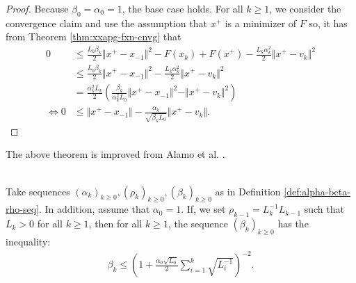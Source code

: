 \documentclass[12pt]{report}
\begin{document}
\begin{proof}
            Because $\beta_0 = \alpha_0 = 1$, the base case holds. 
            For all $k \ge 1$, we consider the convergence claim and use the assumption that $x^+$ is a minimizer of $F$ so, it has from Theorem \ref{thm:xxapg-fxn-cnvg} that 
            \begin{align*}
                0 &\le \frac{L_0\beta_k }{2}\Vert x^+ - x_{-1}\Vert^2 
                - F(x_k) + F(x^+) - \frac{L_k\alpha_k^2}{2}\Vert x^+ - v_k\Vert^2
                \\
                &\le 
                \frac{L_0\beta_k }{2}\Vert x^+ - x_{-1}\Vert^2 
                - \frac{L_k\alpha_k^2}{2}\Vert x^+ - v_k\Vert^2
                \\
                &= \frac{\alpha_k^2L_k}{2}\left(
                    \frac{\beta_k}{\alpha_k^2L_0}
                    \Vert x^+ - x_{-1}\Vert^2 
                    - \Vert x^+ - v_k\Vert^2
                \right)
                \\
                \iff 
                0 &\le 
                \Vert x^+ - x_{-1}\Vert - \frac{\alpha_k}{\sqrt{\beta_k L_0}}\Vert x^+ - v_k\Vert. 
            \end{align*}
        \end{proof}
        \begin{remark}
            The above theorem is improved from Alamo et al. \cite{alamo_restart_2019}. 
        \end{remark}
        \begin{lemma}\;\label{lemma:xxapg-seq-bnd}\\
            Take sequences $(\alpha_k)_{k \ge 0}, (\rho_k)_{k \ge 0}, (\beta_k)_{k \ge 0}$ as in Definition \ref{def:alpha-beta-rho-seq}. 
            In addition, assume that $\alpha_0 = 1$. 
            If, we set $\rho_{k - 1} = L_{k}^{-1}L_{k - 1}$ such that $L_k >0$ for all $k \ge 1$, then for all $k \ge 1$, the sequence $(\beta_k)_{k \ge 0}$ has the inequality: 
            \begin{align*}
                \beta_k \le \left(
                    1 + \frac{\alpha_0\sqrt{L_0}}{2}\sum_{i = 1}^{k} \sqrt{L_i^{-1}}
                \right)^{-2}. 
            \end{align*}
        \end{lemma}
\end{document}
